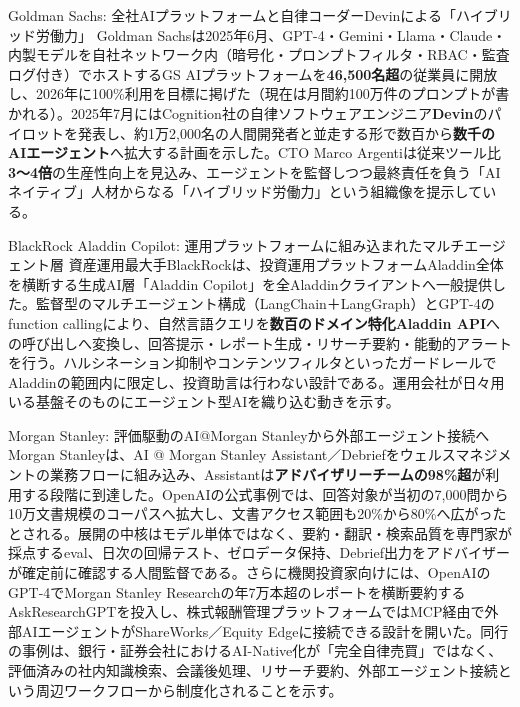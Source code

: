 \begin{casestudy}{Goldman Sachs: 全社AIプラットフォームと自律コーダーDevinによる「ハイブリッド労働力」}
Goldman Sachsは2025年6月、GPT-4・Gemini・Llama・Claude・内製モデルを自社ネットワーク内（暗号化・プロンプトフィルタ・RBAC・監査ログ付き）でホストするGS AIプラットフォームを\textbf{46,500名超}の従業員に開放し、2026年に100\%利用を目標に掲げた（現在は月間約100万件のプロンプトが書かれる）。2025年7月にはCognition社の自律ソフトウェアエンジニア\textbf{Devin}のパイロットを発表し、約1万2,000名の人間開発者と並走する形で数百から\textbf{数千のAIエージェント}へ拡大する計画を示した。CTO Marco Argentiは従来ツール比\textbf{3〜4倍}の生産性向上を見込み、エージェントを監督しつつ最終責任を負う「AIネイティブ」人材からなる「ハイブリッド労働力」という組織像を提示している\cite{x03goldman_cnbc2025,x03goldman_ibm2025}。
\end{casestudy}

\begin{casestudy}{BlackRock Aladdin Copilot: 運用プラットフォームに組み込まれたマルチエージェント層}
資産運用最大手BlackRockは、投資運用プラットフォームAladdin全体を横断する生成AI層「Aladdin Copilot」を全Aladdinクライアントへ一般提供した。監督型のマルチエージェント構成（LangChain＋LangGraph）とGPT-4のfunction callingにより、自然言語クエリを\textbf{数百のドメイン特化Aladdin API}への呼び出しへ変換し、回答提示・レポート生成・リサーチ要約・能動的アラートを行う。ハルシネーション抑制やコンテンツフィルタといったガードレールでAladdinの範囲内に限定し、投資助言は行わない設計である\cite{x03blackrock_aladdincopilot,x03blackrock_microsoft2024}。運用会社が日々用いる基盤そのものにエージェント型AIを織り込む動きを示す。
\end{casestudy}

\begin{casestudy}{Morgan Stanley: 評価駆動のAI@Morgan Stanleyから外部エージェント接続へ}
Morgan Stanleyは、AI @ Morgan Stanley Assistant／Debriefをウェルスマネジメントの業務フローに組み込み、Assistantは\textbf{アドバイザリーチームの98\%超}が利用する段階に到達した。OpenAIの公式事例では、回答対象が当初の7,000問から10万文書規模のコーパスへ拡大し、文書アクセス範囲も20\%から80\%へ広がったとされる。展開の中核はモデル単体ではなく、要約・翻訳・検索品質を専門家が採点するeval、日次の回帰テスト、ゼロデータ保持、Debrief出力をアドバイザーが確定前に確認する人間監督である\cite{x03morganstanley_openai2026}。さらに機関投資家向けには、OpenAIのGPT-4でMorgan Stanley Researchの年7万本超のレポートを横断要約するAskResearchGPTを投入し\cite{x04askresearchgpt2024}、株式報酬管理プラットフォームではMCP経由で外部AIエージェントがShareWorks／Equity Edgeに接続できる設計を開いた\cite{morganstanleymcp2026}。同行の事例は、銀行・証券会社におけるAI-Native化が「完全自律売買」ではなく、評価済みの社内知識検索、会議後処理、リサーチ要約、外部エージェント接続という周辺ワークフローから制度化されることを示す。
\end{casestudy}

